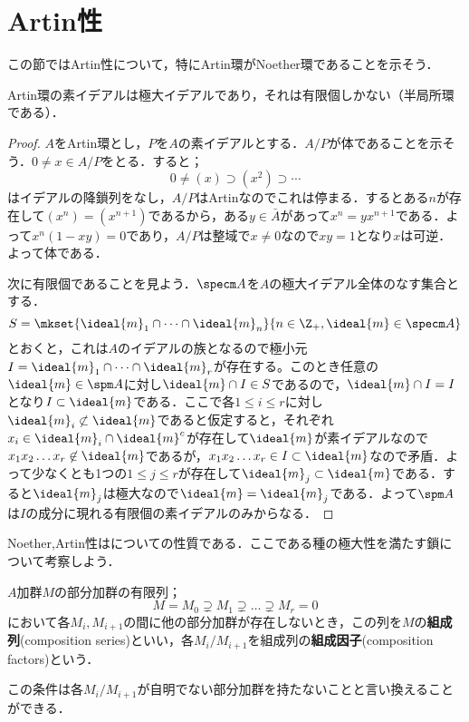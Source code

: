 \section{Artin性}

この節ではArtin性について，特にArtin環がNoether環であることを示そう．
\begin{prop}\label{prop:Artinの素イデアル}
	Artin環の素イデアルは極大イデアルであり，それは有限個しかない（半局所環である）．
\end{prop}
\begin{proof}
	$A$をArtin環とし，$P$を$A$の素イデアルとする．$A/P$が体であることを示そう．$0\neq x\in A/P$をとる．すると；
	\[0\neq(x)\supset(x^2)\supset\cdots\]
	はイデアルの降鎖列をなし，$A/P$はArtinなのでこれは停まる．するとある$n$が存在して$(x^n)=(x^{n+1})$であるから，ある$y\in\bar{A}$があって$x^n=yx^{n+1}$である．よって$x^n(1-xy)=0$であり，$A/P$は整域で$x\neq0$なので$xy=1$となり$x$は可逆．よって体である．
	
	次に有限個であることを見よう．$\specm A$を$A$の極大イデアル全体のなす集合とする．
	\[S=\mkset{\ideal{m}_1\cap\dots\cap\ideal{m}_n}{n\in\Z_+,\ideal{m}\in\specm A}\]
	とおくと，これは$A$のイデアルの族となるので極小元$I=\ideal{m}_1\cap\dots\cap\ideal{m}_r$が存在する。このとき任意の$\ideal{m}\in\spm A$に対し$\ideal{m}\cap I\in S$であるので，$\ideal{m}\cap I=I$となり$I\subset\ideal{m}$である．ここで各$1\leq i\leq r$に対し$\ideal{m}_i\not\subset\ideal{m}$であると仮定すると，それぞれ$x_i\in\ideal{m}_i\cap\ideal{m}^c$が存在して$\ideal{m}$が素イデアルなので$x_1x_2\dots x_r\not\in\ideal{m}$であるが，$x_1x_2\dots x_r\in I\subset\ideal{m}$なので矛盾．よって少なくとも1つの$1\leq j\leq r$が存在して$\ideal{m}_j\subset\ideal{m}$である．すると$\ideal{m}_j$は極大なので$\ideal{m}=\ideal{m}_j$である．よって$\spm A$は$I$の成分に現れる有限個の素イデアルのみからなる．
\end{proof}

Noether,Artin性はについての性質である．ここである種の極大性を満たす鎖について考察しよう．

\begin{defi}[組成列]
	$A$加群$M$の部分加群の有限列；
	\[M=M_0\supsetneq M_1\supsetneq\dots\supsetneq M_r=0\]
	において各$M_i,M_{i+1}$の間に他の部分加群が存在しないとき，この列を$M$の\textbf{組成列}(composition series)といい，各$M_i/M_{i+1}$を組成列の\textbf{組成因子}(composition factors)という．
\end{defi}

この条件は各$M_i/M_{i+1}$が自明でない部分加群を持たないことと言い換えることができる．

